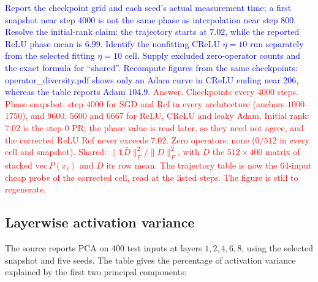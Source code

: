 \documentclass{article}
\newcommand{\zied}[1]{\textcolor{blue}{#1}}
\newcommand{\nat}[1]{\textcolor{red}{#1}}
\theoremstyle{definition}
\theoremstyle{remark}
\begin{document}
\zied{Report the checkpoint grid and each seed's actual measurement time; a first snapshot near step 4000 is not the same phase as interpolation near step 800. Resolve the initial-rank claim: the trajectory starts at $7.02$, while the reported ReLU phase mean is $6.99$. Identify the nonfitting CReLU $\eta=10$ run separately from the selected fitting $\eta=10$ cell. Supply excluded zero-operator counts and the exact formula for ``shared''. Recompute figures from the same checkpoints: operator\_diversity.pdf shows only an Adam curve in CReLU ending near 206, whereas the table reports Adam $104.9$.}
\nat{Answer. Checkpoints every $4000$ steps. Phase snapshot: step $4000$ for SGD and Ref in every architecture (anchors $1000$--$1750$), and $9600$, $5600$ and $6667$ for ReLU, CReLU and leaky Adam. Initial rank: $7.02$ is the step-$0$ PR; the phase value is read later, so they need not agree, and the corrected ReLU Ref never exceeds $7.02$. Zero operators: none ($0/512$ in every cell and snapshot). Shared: $\|\mathbf1\bar D\|_F^2/\|D\|_F^2$, with $D$ the $512\times400$ matrix of stacked $\mathrm{vec}\,P(x_i)$ and $\bar D$ its row mean. The trajectory table is now the $64$-input cheap probe of the corrected cell, read at the listed steps. The figure is still to regenerate.}

\subsection{Layerwise activation variance}\label{app:e10}

The source reports PCA on $400$ test inputs at layers $1,2,4,6,8$, using the selected snapshot and five seeds. The table gives the percentage of activation variance explained by the first two principal components:
\end{document}

